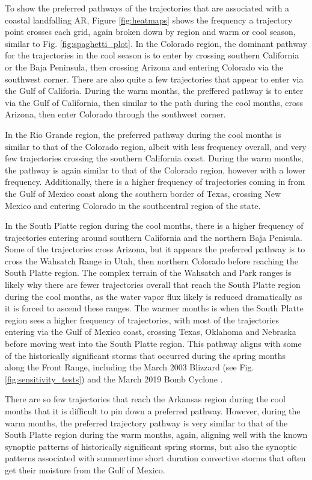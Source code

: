 \documentclass[draft]{agujournal2019}
\begin{document}
To show the preferred pathways of the trajectories that are associated with a coastal landfalling AR, Figure \ref{fig:heatmaps} shows the frequency a trajectory point crosses each grid, again broken down by region and warm or cool season, similar to Fig. \ref{fig:spaghetti_plot}. In the Colorado region, the dominant pathway for the trajectories in the cool season is to enter by crossing southern California or the Baja Peninsula, then crossing Arizona and entering Colorado via the southwest corner. There are also quite a few trajectories that appear to enter via the Gulf of Califoria. During the warm months, the preffered pathway is to enter via the Gulf of California, then similar to the path during the cool months, cross Arizona, then enter Colorado through the southwest corner. 

In the Rio Grande region, the preferred pathway during the cool months is similar to that of the Colorado region, albeit with less frequency overall, and very few trajectories crossing the southern California coast. During the warm months, the pathway is again similar to that of the Colorado region, however with a lower frequency. Additionally, there is a higher frequency of trajectories coming in from the Gulf of Mexico coast along the southern border of Texas, crossing New Mexico and entering Colorado in the southcentral region of the state. 

In the South Platte region during the cool months, there is a higher frequency of trajectories entering around southern California and the northern Baja Penisula. Some of the trajectories cross Arizona, but it appears the preferred pathway is to cross the Wahsatch Range in Utah, then northern Colorado before reaching the South Platte region. The complex terrain of the Wahsatch and Park ranges is likely why there are fewer trajectories overall that reach the South Platte region during the cool months, as the water vapor flux likely is reduced dramatically as it is forced to ascend these ranges. The warmer months is when the South Platte region sees a higher frequency of trajectories, with most of the trajectories entering via the Gulf of Mexico coast, crossing Texas, Oklahoma and Nebraska before moving west into the South Platte region. This pathway aligns with some of the historically significant storms that occurred during the spring months along the Front Range, including the March 2003 Blizzard (see Fig. \ref{fig:sensitivity_tests}) and the March 2019 Bomb Cyclone \cite{Zou2024A2019}. 

There are so few trajectories that reach the Arkansas region during the cool months that it is difficult to pin down a preferred pathway. However, during the warm months, the preferred trajectory pathway is very similar to that of the South Platte region during the warm months, again, aligning well with the known synoptic patterns of historically significant spring storms, but also the synoptic patterns associated with summertime short duration convective storms that often get their moisture from the Gulf of Mexico. 
\end{document}
